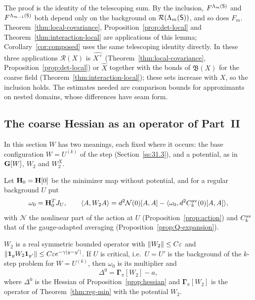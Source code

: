 The proof is the identity of the telescoping sum. By the inclusion, $F^{\Lambda_m(\mathsf S)}$ and $F^{\Lambda_{m-1}(\mathsf S)}$ both depend only on the background on $\mathcal R(\Lambda_m(\mathsf S))$, and so does $F_m$. Theorem~\ref{thm:local-covariance}, Proposition~\ref{prop:det-local} and Theorem~\ref{thm:interaction-local} are applications of this lemma; Corollary~\ref{cor:composed} uses the same telescoping identity directly. In these three applications $\mathcal R(X)$ is $\widehat{X^+}$ (Theorem~\ref{thm:local-covariance}, Proposition~\ref{prop:det-local}) or $\hat X$ together with the bonds of $\mathfrak B(X)$ for the coarse field (Theorem~\ref{thm:interaction-local}); these sets increase with $X$, so the inclusion holds. The estimates needed are comparison bounds for approximants on nested domains, whose differences have seam form.

\subsection{The coarse Hessian as an operator of Part~II}\label{ss:37.2}

In this section $W$ has two meanings, each fixed where it occurs: the base configuration $W=U^{(k)}$ of the step (Section~\ref{ss:31.3}), and a potential, as in $\mathbf G[W]$, $W_2$ and $W_2^X$.

Let $\mathbf H_0=\mathbf H[0]$ be the minimizer map without potential, and for a regular background $U$ put
\[
\omega_0=\mathbf H_0^TJ_U,\qquad\langle A,W_2A\rangle=d^2\mathcal N(0)[A,A]-\langle \omega_0,d^2C^{\rm av}_k(0)[A,A]\rangle,
\]
with $\mathcal N$ the nonlinear part of the action at $U$ (Proposition~\ref{prop:action}) and $C^{\rm av}_k$ that of the gauge-adapted averaging (Proposition~\ref{prop:Q-expansion}).

\begin{lemma}\label{lem:hessian-gamma}
$W_2$ is a real symmetric bounded operator with $\|W_2\|\le C\varepsilon$ and $\|\mathbf 1_yW_2\mathbf 1_{y'}\|\le C\varepsilon e^{-\gamma|y-y'|}$. If $U$ is critical, i.e.\ $U=U'$ is the background of the $k$-step problem for $W=U^{(k)}$, then $\omega_0$ is its multiplier and
\[
\Delta^0=\boldsymbol\Gamma_\pi[W_2]-a,
\]
where $\Delta^0$ is the Hessian of Proposition~\ref{prop:hessian} and $\boldsymbol\Gamma_\pi[W_2]$ is the operator of Theorem~\ref{thm:reg-min} with the potential $W_2$.
\end{lemma}

